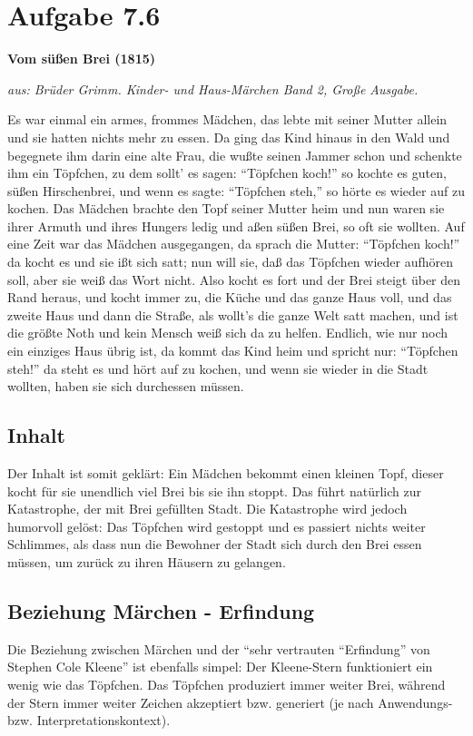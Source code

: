 \documentclass{article}
\begin{document}
\section*{Aufgabe 7.6}
\begin{center}
\textbf{Vom süßen Brei (1815)}

\textit{\footnotesize{aus: Brüder Grimm. Kinder- und Haus-Märchen Band 2, Große Ausgabe.}}
\end{center}
\begin{flushleft}\small
Es war einmal ein armes, frommes Mädchen, das lebte mit seiner Mutter allein und sie hatten nichts mehr zu essen. Da ging das Kind hinaus in den Wald und begegnete ihm darin eine alte Frau, die wußte seinen Jammer schon und schenkte ihm ein Töpfchen, zu dem sollt' es sagen: "`Töpfchen koch!"' so kochte es guten, süßen Hirschenbrei, und wenn es sagte: "`Töpfchen steh,"' so hörte es wieder auf zu kochen. Das Mädchen brachte den Topf seiner Mutter heim und nun waren sie ihrer Armuth und ihres Hungers ledig und aßen süßen Brei, so oft sie wollten. Auf eine Zeit war das Mädchen ausgegangen, da sprach die Mutter: "`Töpfchen koch!"' da kocht es und sie ißt sich satt; nun will sie, daß das Töpfchen wieder aufhören soll, aber sie weiß das Wort nicht. Also kocht es fort und der Brei steigt über den Rand heraus, und kocht immer zu, die Küche und das ganze Haus voll, und das zweite Haus und dann die Straße, als wollt’s die ganze Welt satt machen, und ist die größte Noth und kein Mensch weiß sich da zu helfen. Endlich, wie nur noch ein einziges Haus übrig ist, da kommt das Kind heim und spricht nur: "`Töpfchen steh!"' da steht es und hört auf zu kochen, und wenn sie wieder in die Stadt wollten, haben sie sich durchessen müssen.
\end{flushleft}

\subsection*{Inhalt}
Der Inhalt ist somit geklärt: Ein Mädchen bekommt einen kleinen Topf, dieser kocht für sie unendlich viel Brei bis sie ihn stoppt. Das führt natürlich zur Katastrophe, der mit Brei gefüllten Stadt. Die Katastrophe wird jedoch humorvoll gelöst: Das Töpfchen wird gestoppt und es passiert nichts weiter Schlimmes, als dass nun die Bewohner der Stadt sich durch den Brei essen müssen, um zurück zu ihren Häusern zu gelangen.

\subsection*{Beziehung Märchen - Erfindung}
Die Beziehung zwischen Märchen und der "`sehr vertrauten "`Erfindung"' von Stephen Cole Kleene"' ist ebenfalls simpel: 
Der Kleene-Stern funktioniert ein wenig wie das Töpfchen. Das Töpfchen produziert immer weiter Brei, während der Stern immer weiter Zeichen akzeptiert bzw. generiert (je nach Anwendungs- bzw. Interpretationskontext). 
\end{document}
